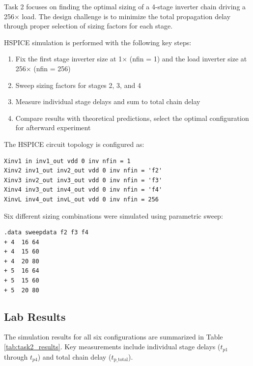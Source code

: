 \documentclass[UTF8,12pt,a4paper]{ctexart}
\begin{document}
Task 2 focuses on finding the optimal sizing of a 4-stage inverter chain driving a 256× load. The design challenge is to minimize the total propagation delay through proper selection of sizing factors for each stage.

HSPICE simulation is performed with the following key steps:

\begin{enumerate}
    \item[1. ] Fix the first stage inverter size at 1× (nfin = 1) and the load inverter size at 256× (nfin = 256)
    \item[2. ] Sweep sizing factors for stages 2, 3, and 4
    \item[3. ] Measure individual stage delays and sum to total chain delay
    \item[4. ] Compare results with theoretical predictions, select the optimal configuration for afterward experiment
\end{enumerate}

The HSPICE circuit topology is configured as:

\begin{lstlisting}
Xinv1 in inv1_out vdd 0 inv nfin = 1
Xinv2 inv1_out inv2_out vdd 0 inv nfin = 'f2'
Xinv3 inv2_out inv3_out vdd 0 inv nfin = 'f3'
Xinv4 inv3_out inv4_out vdd 0 inv nfin = 'f4'
XinvL inv4_out invL_out vdd 0 inv nfin = 256
\end{lstlisting}

Six different sizing combinations were simulated using parametric sweep:

\begin{lstlisting}
.data sweepdata f2 f3 f4
+ 4  16 64
+ 4  15 60
+ 4  20 80
+ 5  16 64
+ 5  15 60
+ 5  20 80
\end{lstlisting}

\subsection{Lab Results}

The simulation results for all six configurations are summarized in Table \ref{tab:task2_results}. Key measurements include individual stage delays ($t_{p1}$ through $t_{p4}$) and total chain delay ($t_{\text{p\_total}}$).
\end{document}
